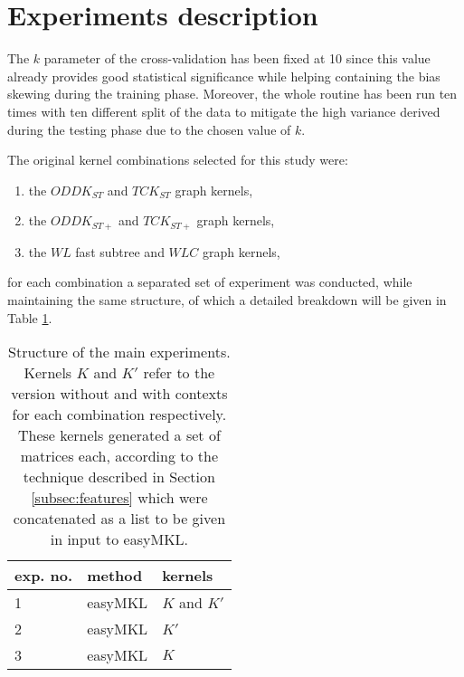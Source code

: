 
\section{Experiments description}
\label{sec:description}

The $k$ parameter of the cross-validation has been fixed at 10 since this value
already provides good statistical significance while helping containing the bias
skewing during the training phase.
Moreover, the whole routine has been run ten times with ten different split of the
data to mitigate the high variance derived during the testing phase due to the
chosen value of $k$.

The original kernel combinations selected for this study were:
\begin{enumerate}
    \item the $ODDK_{ST}$ and $TCK_{ST}$ graph kernels,
    \item the $ODDK_{ST+}$ and $TCK_{ST+}$ graph kernels,
    \item the $WL$ fast subtree and $WLC$ graph kernels,
\end{enumerate}

for each combination a separated set of experiment was conducted, while maintaining
the same structure, of which a detailed breakdown will be given in Table \ref{table:structure}.

\begin{table}[ht]
    \centering
    \begin{tabular}{|l|l|l|}
        \hline
        exp. no. & method & kernels \\
        \hline
        1 & easyMKL & $K$ and $K'$ \\
        \hline
        2 & easyMKL & $K'$ \\
        \hline
        3 & easyMKL & $K$ \\
        \hline
    \end{tabular}
    \caption{Structure of the main experiments. Kernels $K$ and $K'$ refer
    to the version without and with contexts for each combination respectively.
    These kernels generated a set of matrices each, according to the technique
    described in Section \ref{subsec:features} which were concatenated as a list
    to be given in input to easyMKL.}
    \label{table:structure}
\end{table}

